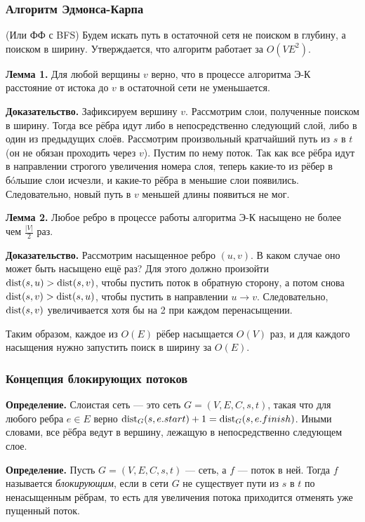 \subsubsection{Алгоритм Эдмонса-Карпа} 
(Или ФФ с BFS) Будем искать путь в остаточной сетя не поиском в глубину, а поиском в ширину. Утверждается, что алгоритм работает за $O(VE^2)$.

\textbf{Лемма 1.} Для любой верщины $v$ верно, что в процессе алгоритма Э-К расстояние от истока до $v$ в остаточной сети не уменьшается.

\textbf{Доказательство.} Зафиксируем вершину $v$.
Рассмотрим слои, полученные поиском в ширину. Тогда все рёбра идут либо в непосредственно следующий слой, либо в один из предыдущих слоёв.
Рассмотрим произвольный кратчайший путь из $s$ в $t$ (он не обязан проходить через $v$).
Пустим по нему поток. 
Так как все рёбра идут в направлении строгого увеличения номера слоя, теперь какие-то из рёбер в бóльшие слои исчезли, и какие-то рёбра в меньшие слои появились.
Следовательно, новый путь в $v$ меньшей длины появиться не мог.

\textbf{Лемма 2.} Любое ребро в процессе работы алгоритма Э-К насыщено не более чем $\frac{|V|}{2}$ раз.

\textbf{Доказательство.} Рассмотрим насыщенное ребро $(u, v)$. В каком случае оно может быть насыщено ещё раз?
Для этого должно произойти $\operatorname{dist}(s, u) > \operatorname{dist}(s, v)$, чтобы пустить поток в обратную сторону, а потом снова $\operatorname{dist}(s, v) > \operatorname{dist}(s, u)$, чтобы пустить в направлении $u \to v$.
Следовательно, $\operatorname{dist}(s, v)$ увеличивается хотя бы на 2 при каждом перенасыщении.

Таким образом, каждое из $O(E)$ рёбер насыщается $O(V)$ раз, и для каждого насыщения нужно запустить поиск в ширину за $O(E)$.

\subsubsection{Концепция блокирующих потоков}
\textbf{Определение.} Слоистая сеть --- это сеть $G = (V, E, C, s, t)$, такая что для любого ребра $e \in E$ верно $\operatorname{dist}_G(s, e.start) + 1 = \operatorname{dist}_G(s, e.finish)$.
Иными словами, все рёбра ведут в вершину, лежащую в непосредственно следующем слое.

\textbf{Определение.} Пусть $G = (V, E, C, s, t)$ --- сеть, а $f$ --- поток в ней.
Тогда $f$ называется \textit{блокирующим}, если в сети $G$ не существует пути из $s$ в $t$ по ненасыщенным рёбрам, то есть для увеличения потока приходится отменять уже пущенный поток.

